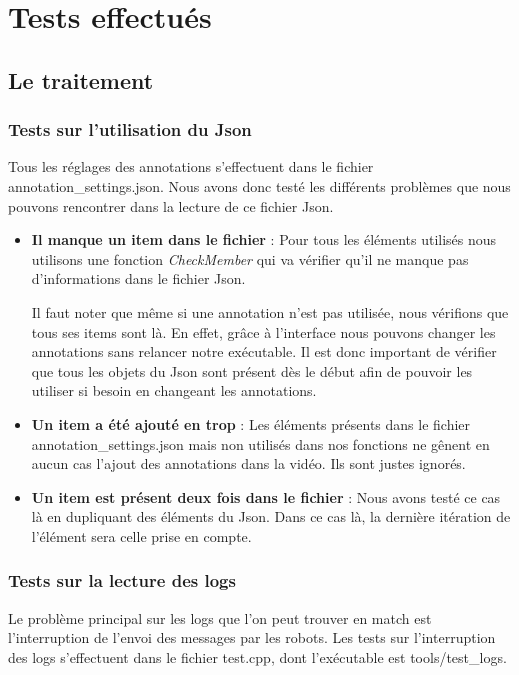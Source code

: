 \chapter{Tests effectués}

\section{Le traitement}

\subsection{Tests sur l'utilisation du Json}

Tous les réglages des annotations s'effectuent dans le fichier annotation\_settings.json. Nous avons donc testé les différents problèmes que nous pouvons rencontrer dans la lecture de ce fichier Json.
\bigskip

\begin{itemize}
    \item \textbf{Il manque un item dans le fichier} : Pour tous les éléments utilisés nous utilisons une fonction \textit{CheckMember} qui va vérifier qu'il ne manque pas d'informations dans le fichier Json.
    
    Il faut noter que même si une annotation n'est pas utilisée, nous vérifions que tous ses items sont là. En effet, grâce à l'interface nous pouvons changer les annotations sans relancer notre exécutable. Il est donc important de vérifier que tous les objets du Json sont présent dès le début afin de pouvoir les utiliser si besoin en changeant les annotations.
    \item \textbf{Un item a été ajouté en trop} : Les éléments présents dans le fichier annotation\_settings.json mais non utilisés dans nos fonctions ne gênent en aucun cas l'ajout des annotations dans la vidéo. Ils sont justes ignorés.
    \item \textbf{Un item est présent deux fois dans le fichier} : Nous avons testé ce cas là en dupliquant des éléments du Json. Dans ce cas là, la dernière itération de l'élément sera celle prise en compte.
\end{itemize}

\subsection{Tests sur la lecture des logs}

Le problème principal sur les logs que l'on peut trouver en match est l'interruption de l'envoi des messages par les robots. Les tests sur l'interruption des logs s'effectuent dans le fichier test.cpp, dont l'exécutable est tools/test\_logs.
\bigskip

